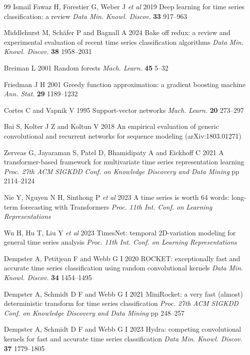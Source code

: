 \documentclass[12pt]{iopjournal}
\begin{document}
\begin{thebibliography}{99}
 Ismail Fawaz H, Forestier G, Weber J \textit{et al} 2019 Deep learning for time series classification: a review \textit{Data Min. Knowl. Discov.} \textbf{33} 917--963

 Middlehurst M, Sch\"afer P and Bagnall A 2024 Bake off redux: a review and experimental evaluation of recent time series classification algorithms \textit{Data Min. Knowl. Discov.} \textbf{38} 1958--2031

 Breiman L 2001 Random forests \textit{Mach. Learn.} \textbf{45} 5--32

 Friedman J H 2001 Greedy function approximation: a gradient boosting machine \textit{Ann. Stat.} \textbf{29} 1189--1232

 Cortes C and Vapnik V 1995 Support-vector networks \textit{Mach. Learn.} \textbf{20} 273--297

 Bai S, Kolter J Z and Koltun V 2018 An empirical evaluation of generic convolutional and recurrent networks for sequence modeling (arXiv:1803.01271)

 Zerveas G, Jayaraman S, Patel D, Bhamidipaty A and Eickhoff C 2021 A transformer-based framework for multivariate time series representation learning \textit{Proc. 27th ACM SIGKDD Conf. on Knowledge Discovery and Data Mining} pp 2114--2124

 Nie Y, Nguyen N H, Sinthong P \textit{et al} 2023 A time series is worth 64 words: long-term forecasting with Transformers \textit{Proc. 11th Int. Conf. on Learning Representations}

 Wu H, Hu T, Liu Y \textit{et al} 2023 TimesNet: temporal 2D-variation modeling for general time series analysis \textit{Proc. 11th Int. Conf. on Learning Representations}

 Dempster A, Petitjean F and Webb G I 2020 ROCKET: exceptionally fast and accurate time series classification using random convolutional kernels \textit{Data Min. Knowl. Discov.} \textbf{34} 1454--1495

 Dempster A, Schmidt D F and Webb G I 2021 MiniRocket: a very fast (almost) deterministic transform for time series classification \textit{Proc. 27th ACM SIGKDD Conf. on Knowledge Discovery and Data Mining} pp 248--257

 Dempster A, Schmidt D F and Webb G I 2023 Hydra: competing convolutional kernels for fast and accurate time series classification \textit{Data Min. Knowl. Discov.} \textbf{37} 1779--1805


\end{thebibliography}
\end{document}
